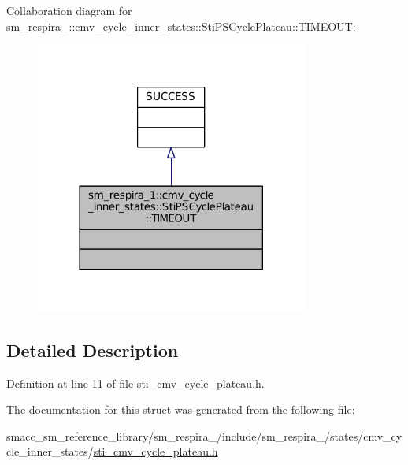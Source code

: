 Collaboration diagram for sm\+\_\+respira\+\_\+:\+:cmv\+\_\+cycle\+\_\+inner\+\_\+states\+:\+:Sti\+P\+S\+Cycle\+Plateau\+:\+:T\+I\+M\+E\+O\+UT\+:
\nopagebreak
\begin{figure}[H]
\begin{center}
\leavevmode
\includegraphics[width=254pt]{structsm__respira__1_1_1cmv__cycle__inner__states_1_1StiPSCyclePlateau_1_1TIMEOUT__coll__graph}
\end{center}
\end{figure}


\subsection{Detailed Description}


Definition at line 11 of file sti\+\_\+cmv\+\_\+cycle\+\_\+plateau.\+h.



The documentation for this struct was generated from the following file\+:\begin{DoxyCompactItemize}
\item 
smacc\+\_\+sm\+\_\+reference\+\_\+library/sm\+\_\+respira\+\_/include/sm\+\_\+respira\+\_/states/cmv\+\_\+cycle\+\_\+inner\+\_\+states/\hyperlink{sti__cmv__cycle__plateau_8h}{sti\+\_\+cmv\+\_\+cycle\+\_\+plateau.\+h}\end{DoxyCompactItemize}
